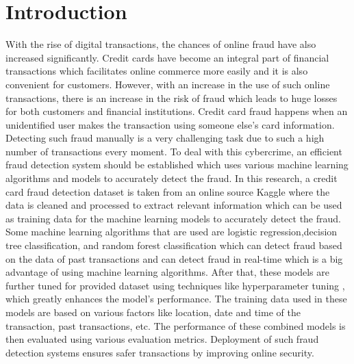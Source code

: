 \chapter{Introduction}
\label{ch:into} %

With the rise of digital transactions, the chances of online fraud have also increased 
significantly. Credit cards have become an integral part of financial transactions which facilitates online commerce more easily and it is also convenient for customers. However, with an increase in the use of such online transactions, there is an increase in the risk of fraud which leads to huge losses for both customers and financial institutions. Credit card fraud happens when an unidentified user makes the transaction using someone else’s card information.
Detecting such fraud manually is a very challenging task due to such a high number of transactions every moment. To deal with this cybercrime, an efficient fraud detection system \citep{Dornadula-2019} should be established which uses various machine learning algorithms and models to accurately detect the fraud. In this research, a credit card fraud detection dataset  is taken from an online source Kaggle where the data is cleaned and processed to extract relevant information which can be used as training data for the machine learning models to accurately detect the fraud. Some machine learning algorithms \citep{Shah-2023} that are used are logistic regression,decision tree classification, and random forest classification which can detect fraud based on the data of past transactions and can detect fraud in real-time which is a big advantage of using machine learning algorithms. After that, these models are further tuned for provided dataset  using techniques like hyperparameter tuning \citep{Dalal-2022} , which greatly enhances the model's performance. The training data used in these models are based on various factors like location, date and time of the transaction, past transactions, etc. The performance of these combined models is then evaluated using various evaluation metrics. Deployment of such fraud detection systems ensures safer transactions by improving online security.





